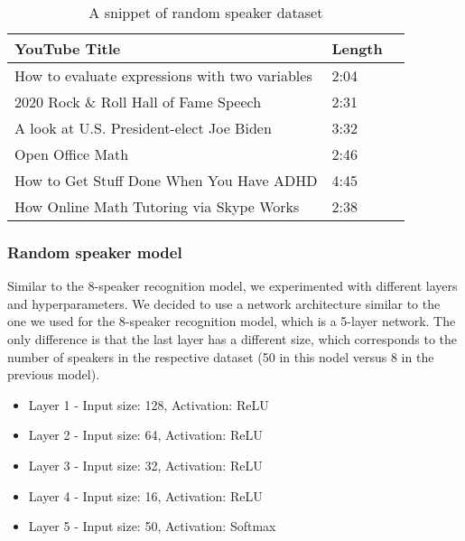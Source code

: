 \documentclass[10pt,twocolumn,letterpaper]{article}
\begin{document}
\begin{table}[h]
        \begin{tabular}{|l|l|l|}
        \hline
        \textbf{YouTube Title}                                       & \textbf{Length} \\ \hline
        How to evaluate expressions with two variables               & 2:04                         \\ \hline
        2020 Rock \& Roll Hall of Fame Speech                        & 2:31                         \\ \hline
        A look at U.S. President-elect Joe Biden                     & 3:32                         \\ \hline
        Open Office Math                                             & 2:46                         \\ \hline
        How to Get Stuff Done When You Have ADHD                     & 4:45                         \\ \hline
        How Online Math Tutoring via Skype Works                     & 2:38                         \\ \hline
        \end{tabular}
        \caption{A snippet of random speaker dataset}
        \label{tab:random-speaker-dataset}
\end{table}

\subsubsection{Random speaker model}

Similar to the 8-speaker recognition model, we experimented with different layers and hyperparameters. We decided to use a network architecture similar to the one we used for the 8-speaker recognition model, which is a 5-layer network. The only difference is that the last layer has a different size, which corresponds to the number of speakers in the respective dataset (50 in this nodel versus 8 in the previous model).

\begin{itemize}[itemsep=-5pt]
    \item Layer 1 - Input size: 128, Activation: ReLU
    \item Layer 2 - Input size: 64, Activation: ReLU
    \item Layer 3 - Input size: 32, Activation: ReLU
    \item Layer 4 - Input size: 16, Activation: ReLU
    \item Layer 5 - Input size: 50, Activation: Softmax
\end{itemize}
\end{document}
